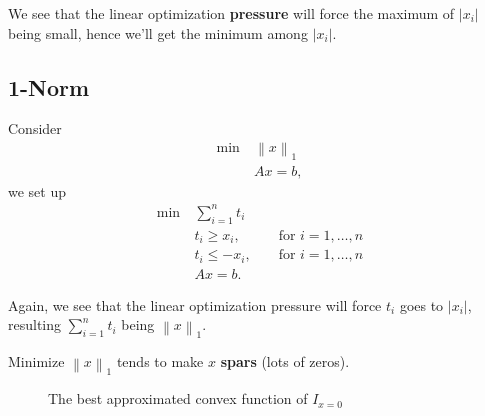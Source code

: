 We see that the linear optimization \textbf{pressure} will force the maximum of \(\left\vert x_i \right\vert \) being small, hence
we'll get the minimum among \(\left\vert x_i \right\vert \).

\subsection{1-Norm}
Consider
\begin{align*}
	\min~ & \left\lVert x\right\rVert_1 \\
	      & Ax = b,
\end{align*}
we set up
\[
	\begin{alignedat}{3}
		\min~ & \sum\limits_{i=1}^{n} t_i                \\
		& t_i\geq x_i, && \text{ for }i = 1, \ldots ,n  \\
		& t_i\leq -x_i, && \text{ for }i = 1, \ldots ,n \\
		& Ax = b.
	\end{alignedat}
\]

Again, we see that the linear optimization pressure will force \(t_i\) goes to \(\left\vert x_i \right\vert \), resulting
\(\sum\limits_{i=1}^{n} t_i\) being \(\left\lVert x\right\rVert_1\).

\begin{remark}
	Minimize \(\left\lVert x\right\rVert_1\) tends to make \(x\) \textbf{spars} (lots of zeros).
	\begin{figure}[H]
		\centering
		\caption{The best approximated convex function of \(I_{x = 0}\) }
		\label{fig:1-norm}
	\end{figure}
\end{remark}
